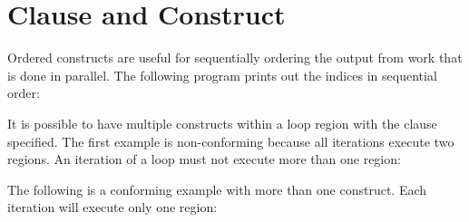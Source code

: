 \pagebreak
\section{ Clause and  Construct}
\label{sec:ordered}

Ordered constructs  are useful for sequentially ordering the output from work that 
is done in parallel. The following program prints out the indices in sequential 
order:



It is possible to have multiple  constructs within a loop region 
with the  clause specified. The first example is non-conforming 
because all iterations execute two  regions. An iteration of a 
loop must not execute more than one  region:



The following is a conforming example with more than one  construct. 
Each iteration will execute only one  region:




